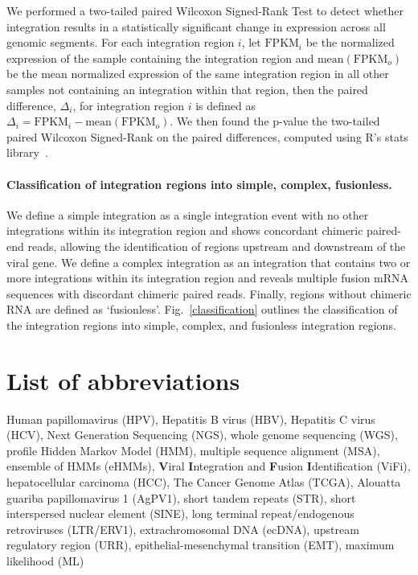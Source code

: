 \documentclass{bmcart}
\begin{document}
We performed a two-tailed paired Wilcoxon Signed-Rank Test to detect whether integration results in a statistically significant change in expression across all genomic segments.  For each integration region $i$, let $\mbox{FPKM}_i$ be the normalized expression of the sample containing the integration region and $\mbox{mean}(\mbox{FPKM}_o)$ be the mean normalized expression of the same integration region in all other samples not containing an integration within that region, then the paired difference, $\Delta_i$, for integration region $i$ is defined as $\Delta_i =\mbox{FPKM}_i-\mbox{mean}(\mbox{FPKM}_o)$.  We then found the p-value the two-tailed paired Wilcoxon Signed-Rank on the paired differences, computed using R's stats library~\cite{R2015}.

\paragraph{Classification of integration regions into simple, complex, fusionless.}
We define a simple integration as a single integration event with no other
integrations within its integration region and shows concordant
chimeric paired-end reads, allowing the identification of regions
upstream and downstream of the viral gene.  We define a complex
integration as an integration that contains two or more integrations
within its integration region and reveals multiple fusion mRNA
sequences with discordant chimeric paired reads. Finally, regions
without chimeric RNA are defined as `fusionless'.  Fig.~\ref{classification} outlines the 
classification of the integration regions into simple, complex, and 
fusionless integration regions.

\section*{List of abbreviations}
Human papillomavirus (HPV), Hepatitis B virus (HBV), Hepatitis C virus (HCV), Next Generation Sequencing (NGS), whole genome sequencing (WGS), profile Hidden Markov Model (HMM), multiple sequence alignment (MSA), ensemble of HMMs (eHMMs), \textbf{V}iral \textbf{I}ntegration and \textbf{F}usion \textbf{I}dentification (ViFi), hepatocellular carcinoma (HCC), The Cancer Genome Atlas (TCGA), Alouatta guariba papillomavirus 1 (AgPV1), short tandem repeats (STR), short interspersed nuclear element (SINE), long terminal repeat/endogenous retroviruses (LTR/ERV1), extrachromosomal DNA (ecDNA), upstream regulatory region (URR), epithelial-mesenchymal transition
(EMT), maximum likelihood (ML)
\end{document}
